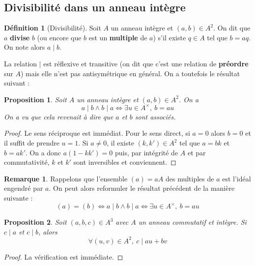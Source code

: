 \documentclass[french]{book}
\theoremstyle{plain}
\newtheorem{prop}{Proposition}[chapter]
\theoremstyle{definition}
\newtheorem{dfn}{Définition}[chapter]
\newtheorem{rmq}{Remarque}[chapter]
\theoremstyle{remark}
\begin{document}
\subsection{Divisibilité dans un anneau intègre}
\begin{dfn}[Divisibilité]
	Soit $A$ un anneau intègre et $(a,b)\in A^2$. On dit que $a$ \textbf{divise} $b$ (ou encore que $b$ est un \textbf{multiple} de $a$) s'il existe $q\in A$ tel que $b=aq$. On note alors $a\mid b$.
\end{dfn}
La relation $\mid$ est réflexive et transitive (on dit que c'est une relation de \textbf{préordre} sur $A$) mais elle n'est pas antisymétrique en général. On a toutefois le résultat suivant :
\begin{prop}
	Soit $A$ un anneau intègre et $(a,b)\in A^2$. On a $$a\mid b\land b\mid a\iff \exists u\in A^\times,\ b=au$$ On a vu que cela revenait à dire que $a$ et $b$ sont associés. 
\end{prop}
\begin{proof}
	Le sens réciproque est immédiat. Pour le sens direct, si $a=0$ alors $b=0$ et il suffit de prendre $u=1$. Si $a\ne0$, il existe $(k,k')\in A^2$ tel que $a=bk$ et $b=ak'$. On a donc $a(1-kk')=0$ puis, par intégrité de $A$ et par commutativité, $k$ et $k'$ sont inversibles et conviennent.
\end{proof}
\begin{rmq}
	Rappelons que l'ensemble $(a)=aA$ des multiples de $a$ est l'idéal engendré par $a$. On peut alors reformuler le résultat précédent de la manière suivante : $$(a)=(b)\iff a\mid b\land b\mid a\iff \exists u\in A^\times,\ b=au$$
\end{rmq}
\begin{prop}
	Soit $(a,b,c)\in A^3$ avec $A$ un anneau commutatif et intègre. Si $c\mid a$ et $c\mid b$, alors $$\forall(u,v)\in A^2,\ c\mid au+bv$$
\end{prop}
\begin{proof}
	La vérification est immédiate.
\end{proof}
\end{document}
